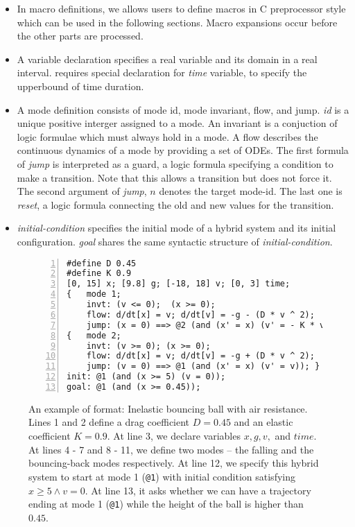 \begin{itemize}
\item In macro definitions, we allows users to define macros in C
preprocessor style which can be used in the following
sections. Macro expansions occur before the other parts are processed.

\item A variable declaration specifies a real variable and its domain
  in a real interval. \dReach{} requires special declaration for
  \textit{time} variable, to specify the upperbound of time duration.

\item A mode definition consists of mode id, mode invariant, flow, and jump.
\textit{id} is a unique positive interger assigned to a mode. An
invariant is a conjuction of logic formulae which must always hold in
a mode. A flow describes the continuous dynamics of a mode by providing
a set of ODEs. The first
formula of \textit{jump} is interpreted as a guard, a logic formula
specifying a condition to make a transition. Note that this allows a
transition but does not force it. The second argument of
\textit{jump}, $n$ denotes the target mode-id. The last one is
\textit{reset}, a logic formula connecting the old and new values for
the transition.

\item \textit{initial-condition} specifies the initial mode of a hybrid
system and its initial configuration. \textit{goal} shares the same
syntactic structure of \textit{initial-condition}.
\end{itemize}
\begin{figure}
  \centering
  \begin{Verbatim}[fontfamily=courier, frame=single, framesep=1mm,
  numbers=left, fontsize=\scriptsize]
#define D 0.45
#define K 0.9
[0, 15] x; [9.8] g; [-18, 18] v; [0, 3] time;
{   mode 1;
    invt: (v <= 0);  (x >= 0);
    flow: d/dt[x] = v; d/dt[v] = -g - (D * v ^ 2);
    jump: (x = 0) ==> @2 (and (x' = x) (v' = - K * v)); }
{   mode 2;
    invt: (v >= 0); (x >= 0);
    flow: d/dt[x] = v; d/dt[v] = -g + (D * v ^ 2);
    jump: (v = 0) ==> @1 (and (x' = x) (v' = v)); }
init: @1 (and (x >= 5) (v = 0));
goal: @1 (and (x >= 0.45));
\end{Verbatim}
\caption{An example of \drh{} format: Inelastic bouncing ball with air
  resistance. Lines 1 and 2 define a drag coefficient $D = 0.45$ and
  an elastic coefficient $K = 0.9$. At line 3, we declare variables
  $x, g, v,$ and $time$. At lines 4 - 7 and 8 - 11, we define two
  modes -- the falling and the bouncing-back modes respectively. At
  line 12, we specify this hybrid system to start at mode 1
  (\texttt{@1}) with initial condition satisfying
  $x \ge 5 \land v = 0$. At line 13, it asks whether we can have
  a trajectory ending at mode 1 (\texttt{@1}) while the height of the
  ball is higher than $0.45$.}
\label{fig:bouncing-ball-drh}
\end{figure}
\vspace{-1.0em}
